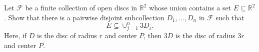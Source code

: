 Let $\mathcal F$ be a finite collection of open discs in $\mathbb R^2$
whose union contains a set $E\subseteq \mathbb R^2$.  Show that there
is a pairwise disjoint subcollection $D_1,\ldots, D_n$ in $\mathcal F$
such that
\[E\subseteq \cup_{j=1}^n 3D_j.\]
Here, if $D$ is the disc of radius $r$ and center $P$, then $3D$ is the
disc of radius $3r$ and center $P$.
